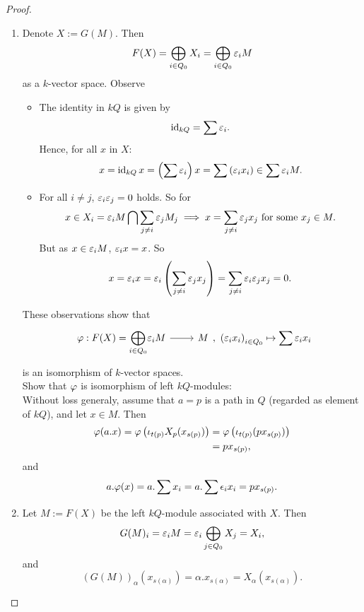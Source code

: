 \begin{proof}
  \begin{enumerate}
    \item Denote $X:=G(M)$. Then
    \[
    F(X) = \bigoplus_{i\in Q_0}X_i = \bigoplus_{i\in Q_0}\varepsilon_iM
    \]
    as a $k$-vector space. Observe
    \begin{itemize}
      \item The identity in $kQ$ is given by
      \[
      \operatorname{id}_{kQ} = \sum \varepsilon_i.
      \]
      Hence, for all $x$ in $X$:
      \[
      x = \operatorname{id}_{kQ}x = \left(\sum \varepsilon_i\right)x = \sum\left(\varepsilon_ix_i\right)\in \sum \varepsilon_iM.
      \]
      \item For all $i\neq j$, $\varepsilon_i\varepsilon_j=0$ holds. So for
      \[
      x\in X_i=\varepsilon_iM\bigcap \sum_{j\neq i}\varepsilon_jM_j\implies x = \sum_{j\neq i} \varepsilon_jx_j\text{ for some }x_j\in M.
      \]
      But as $x\in \varepsilon_iM$, $\varepsilon_ix=x$. So
      \[
      x=\varepsilon_ix=\varepsilon_i\left(\sum_{j\neq i}\varepsilon_jx_j\right)=\sum_{j\neq i}\varepsilon_i\varepsilon_j x_j = 0.
      \]
    \end{itemize}
    These observations show that
    \[
    \begin{tikzcd}
    \pphi:F(X)={\displaystyle\bigoplus_{i\in Q_0}}\eepsilon_iM\ar{r}& M\end{tikzcd},~\left(\eepsilon_ix_i\right)_{i\in Q_0}\mapsto \sum \eepsilon_ix_i
    \]
    is an isomorphism of $k$-vector spaces. \\
    Show that $\varphi$ is isomorphism of left $kQ$-modules:\\
    Without loss generaly, assume that $a=p$ is a path in $Q$ (regarded as element of $kQ$), and let $x\in M$. Then
    \begin{align*}
      \varphi(a.x) = \varphi\left(\iota_{t(p)}X_p(x_{s(p)})\right) &= \varphi\left(\iota_{t(p)}(px_{s(p)})\right)\\
      &= px_{s(p)},
    \end{align*}
    and
    \begin{align*}
      a.\varphi(x)= a.\sum x_i = a. \sum \epsilon_ix_i = px_{s(p)}.
    \end{align*}
  \item Let $M:= F(X)$ be the left $kQ$-module associated with $X$. Then
  \[
  G(M)_i = \varepsilon_iM = \varepsilon_i \bigoplus_{j\in Q_0}X_j = X_i,
  \]
  and
  \[
  \left( G(M)\right)_{\alpha}(x_{s(\alpha)}) = \alpha.x_{s(\alpha)} = X_{\alpha}(x_{s(\alpha)}).
  \]
  \end{enumerate}

\end{proof}
